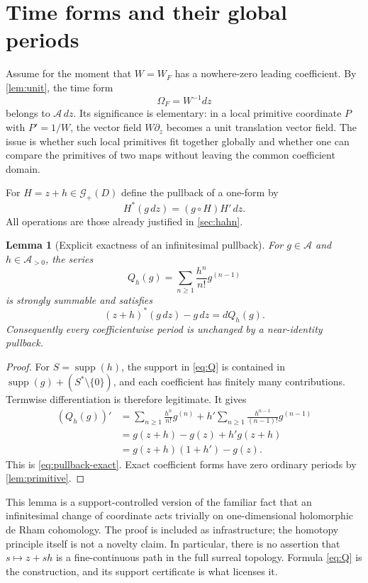 \documentclass[11pt,a4paper]{article}
\numberwithin{equation}{section}
\newtheorem{lemma}[lemma]{Lemma}
\theoremstyle{definition}
\theoremstyle{remark}
\newcommand{\A}{\mathcal A}
\newcommand{\G}{\mathcal G}
\newcommand{\supp}{\operatorname{supp}}
\begin{document}
\section{Time forms and their global periods}
\label{sec:timeforms}

Assume for the moment that $W=W_F$ has a nowhere-zero leading coefficient.
By \cref{lem:unit}, the time form
\[
 \Omega_F=W^{-1}dz
\]
belongs to $\A\,dz$.  Its significance is elementary: in a local primitive
coordinate $P$ with $P'=1/W$, the vector field $W\partial_z$ becomes a
unit translation vector field.  The issue is whether such local primitives
fit together globally and whether one can compare the primitives of two
maps without leaving the common coefficient domain.

For $H=z+h\in\G_+(D)$ define the pullback of a one-form by
\[
 H^*(g\,dz)=(g\circ H)H'\,dz.
\]
All operations are those already justified in \cref{sec:hahn}.

\begin{lemma}[Explicit exactness of an infinitesimal pullback]
\label{lem:homotopy}
For $g\in\A$ and $h\in\A_{>0}$, the series
\begin{equation}\label{eq:Q}
 Q_h(g)=\sum_{n\geq1}\frac{h^n}{n!}g^{(n-1)}
\end{equation}
is strongly summable and satisfies
\begin{equation}\label{eq:pullback-exact}
 (z+h)^*(g\,dz)-g\,dz=dQ_h(g).
\end{equation}
Consequently every coefficientwise period is unchanged by a near-identity
pullback.
\end{lemma}
\begin{proof}
For $S=\supp(h)$, the support in \eqref{eq:Q} is contained in
$\supp(g)+(S^*\setminus\{0\})$, and each coefficient has finitely many
contributions.  Termwise differentiation is therefore legitimate.  It gives
\begin{align*}
 (Q_h(g))'
 &=\sum_{n\geq1}\frac{h^n}{n!}g^{(n)}
   +h'\sum_{n\geq1}\frac{h^{n-1}}{(n-1)!}g^{(n-1)}\\
 &=g(z+h)-g(z)+h'g(z+h)\\
 &=g(z+h)(1+h')-g(z).
\end{align*}
This is \eqref{eq:pullback-exact}.  Exact coefficient forms have zero
ordinary periods by \cref{lem:primitive}.
\end{proof}

This lemma is a support-controlled version of the familiar fact that an
infinitesimal change of coordinate acts trivially on one-dimensional
holomorphic de Rham cohomology.  The proof is included as infrastructure;
the homotopy principle itself is not a novelty claim.  In particular,
there is no assertion that $s\mapsto z+sh$ is a fine-continuous path in the
full surreal topology.  Formula \eqref{eq:Q} is the construction, and its
support certificate is what licenses it.
\end{document}
